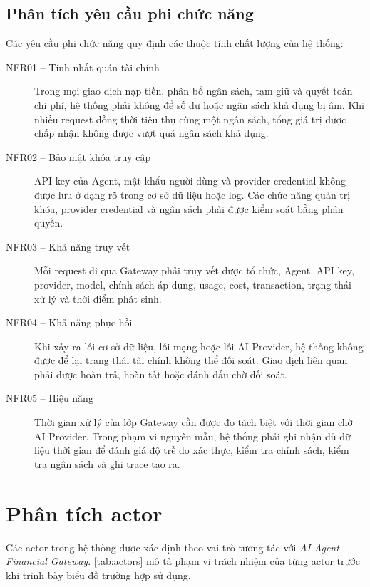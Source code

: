 
\subsection*{Phân tích yêu cầu phi chức năng}

Các yêu cầu phi chức năng quy định các thuộc tính chất lượng của hệ thống:

\begin{description}
    \item[NFR01 -- Tính nhất quán tài chính] Trong mọi giao dịch nạp tiền, phân bổ ngân sách, tạm giữ và quyết toán chi phí, hệ thống phải không để số dư hoặc ngân sách khả dụng bị âm. Khi nhiều request đồng thời tiêu thụ cùng một ngân sách, tổng giá trị được chấp nhận không được vượt quá ngân sách khả dụng.
    \item[NFR02 -- Bảo mật khóa truy cập] API key của Agent, mật khẩu người dùng và provider credential không được lưu ở dạng rõ trong cơ sở dữ liệu hoặc log. Các chức năng quản trị khóa, provider credential và ngân sách phải được kiểm soát bằng phân quyền.
    \item[NFR03 -- Khả năng truy vết] Mỗi request đi qua Gateway phải truy vết được tổ chức, Agent, API key, provider, model, chính sách áp dụng, usage, cost, transaction, trạng thái xử lý và thời điểm phát sinh.
    \item[NFR04 -- Khả năng phục hồi] Khi xảy ra lỗi cơ sở dữ liệu, lỗi mạng hoặc lỗi AI Provider, hệ thống không được để lại trạng thái tài chính không thể đối soát. Giao dịch liên quan phải được hoàn trả, hoàn tất hoặc đánh dấu chờ đối soát.
    \item[NFR05 -- Hiệu năng] Thời gian xử lý của lớp Gateway cần được đo tách biệt với thời gian chờ AI Provider. Trong phạm vi nguyên mẫu, hệ thống phải ghi nhận đủ dữ liệu thời gian để đánh giá độ trễ do xác thực, kiểm tra chính sách, kiểm tra ngân sách và ghi trace tạo ra.
\end{description}

\section{Phân tích actor}

Các actor trong hệ thống được xác định theo vai trò tương tác với \textit{AI Agent Financial Gateway}. \cref{tab:actors} mô tả phạm vi trách nhiệm của từng actor trước khi trình bày biểu đồ trường hợp sử dụng.

